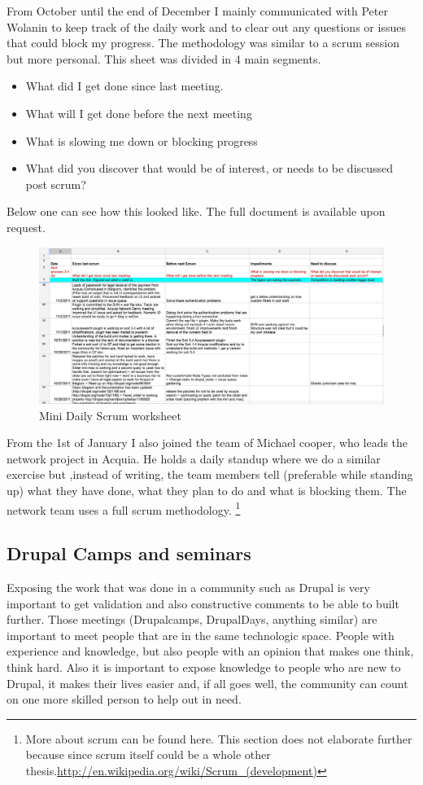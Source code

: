 From October until the end of December I mainly communicated with Peter Wolanin to keep track of the daily work and to clear out any questions or issues that could block my progress. The methodology was similar to a scrum session but more personal. This sheet was divided in 4 main segments.
\begin{itemize}
  \item What did I get done since last meeting.
  \item What will I get done before the next meeting
  \item What is slowing me down or blocking progress
  \item What did you discover that would be of interest, or needs to be discussed post scrum?
\end{itemize}

Below one can see how this looked like. The full document is available upon request. 
\begin{figure}[H]
     \includegraphics[width=\textwidth]{images/scrum_example_solr.jpg}
     \caption{Mini Daily Scrum worksheet}
\end{figure}

From the 1st of January I also joined the team of Michael cooper, who leads the network project in Acquia. He holds a daily standup where we do a similar exercise but ,instead of writing, the team members tell (preferable while standing up) what they have done, what they plan to do and what is blocking them. The network team uses a full scrum methodology. \footnote{More about scrum can be found here. This section does not elaborate further because since scrum itself could be a whole other thesis.\url{http://en.wikipedia.org/wiki/Scrum_(development)}}

\subsection{Drupal Camps and seminars}
Exposing the work that was done in a community such as Drupal is very important to get validation and also constructive comments to be able to built further. Those meetings (Drupalcamps, DrupalDays, anything similar) are important to meet people that are in the same technologic space. People with experience and knowledge, but also people with an opinion that makes one think, think hard. Also it is important to expose knowledge to people who are new to Drupal, it makes their lives easier and, if all goes well, the community can count on one more skilled person to help out in need. 

